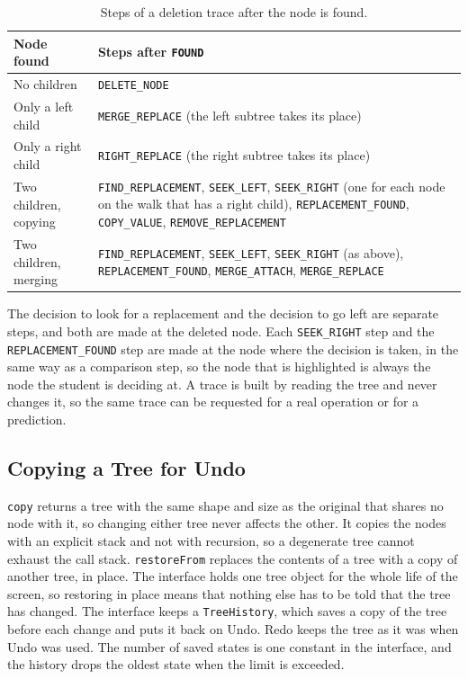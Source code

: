 \begin{table}[H]
\centering
\small
\caption{Steps of a deletion trace after the node is found.}
\label{tab:deletesteps}
\begin{tabularx}{\textwidth}{p{4.2cm} X}
\toprule
Node found & Steps after \texttt{FOUND} \\
\midrule
No children & \texttt{DELETE\_NODE} \\
Only a left child & \texttt{MERGE\_REPLACE} (the left subtree takes its place) \\
Only a right child & \texttt{RIGHT\_REPLACE} (the right subtree takes its place) \\
Two children, copying & \texttt{FIND\_REPLACEMENT}, \texttt{SEEK\_LEFT}, \texttt{SEEK\_RIGHT} (one for each node on the walk that has a right child), \texttt{REPLACEMENT\_FOUND}, \texttt{COPY\_VALUE}, \texttt{REMOVE\_REPLACEMENT} \\
Two children, merging & \texttt{FIND\_REPLACEMENT}, \texttt{SEEK\_LEFT}, \texttt{SEEK\_RIGHT} (as above), \texttt{REPLACEMENT\_FOUND}, \texttt{MERGE\_ATTACH}, \texttt{MERGE\_REPLACE} \\
\bottomrule
\end{tabularx}
\end{table}

The decision to look for a replacement and the decision to go left are separate steps, and both are made at the deleted node. Each \texttt{SEEK\_RIGHT} step and the \texttt{REPLACEMENT\_FOUND} step are made at the node where the decision is taken, in the same way as a comparison step, so the node that is highlighted is always the node the student is deciding at. A trace is built by reading the tree and never changes it, so the same trace can be requested for a real operation or for a prediction.

\subsection{Copying a Tree for Undo}
\texttt{copy} returns a tree with the same shape and size as the original that shares no node with it, so changing either tree never affects the other. It copies the nodes with an explicit stack and not with recursion, so a degenerate tree cannot exhaust the call stack. \texttt{restoreFrom} replaces the contents of a tree with a copy of another tree, in place. The interface holds one tree object for the whole life of the screen, so restoring in place means that nothing else has to be told that the tree has changed. The interface keeps a \texttt{TreeHistory}, which saves a copy of the tree before each change and puts it back on Undo. Redo keeps the tree as it was when Undo was used. The number of saved states is one constant in the interface, and the history drops the oldest state when the limit is exceeded.

